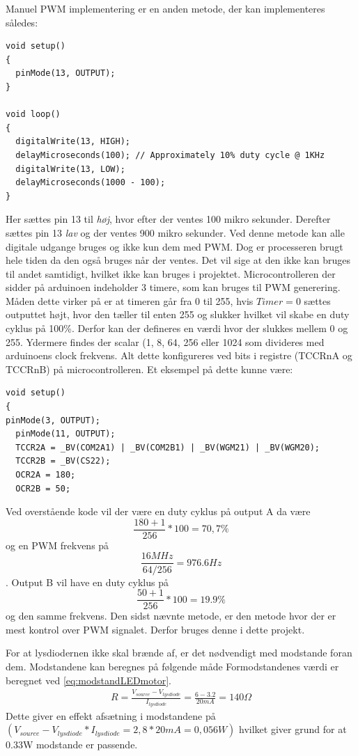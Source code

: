 Manuel PWM implementering er en anden metode, der kan implementeres således:

\begin{lstlisting}
void setup()
{
  pinMode(13, OUTPUT);
}

void loop()
{
  digitalWrite(13, HIGH);
  delayMicroseconds(100); // Approximately 10% duty cycle @ 1KHz
  digitalWrite(13, LOW);
  delayMicroseconds(1000 - 100);
}
\end{lstlisting}

Her sættes pin 13 til \textit{høj}, hvor efter der ventes 100 mikro sekunder. Derefter sættes pin 13 \textit{lav} og der ventes 900 mikro sekunder. Ved denne metode kan alle digitale udgange bruges og ikke kun dem med PWM. Dog er processeren brugt hele tiden da den også bruges når der ventes. Det vil sige at den ikke kan bruges til andet samtidigt, hvilket ikke kan bruges i projektet.
Microcontrolleren der sidder på arduinoen indeholder 3 timere, som kan bruges til PWM generering.  Måden dette virker på er at timeren går fra 0 til 255, hvis $Timer=0$ sættes outputtet højt, hvor den tæller til enten 255 og slukker hvilket vil skabe en duty cyklus på 100\%. Derfor kan der defineres en værdi hvor der slukkes mellem 0 og 255. Ydermere findes der scalar (1, 8, 64, 256 eller 1024 som divideres med arduinoens clock frekvens. Alt dette konfigureres ved bits i registre (TCCRnA og TCCRnB) på microcontrolleren. Et eksempel på dette kunne være: 

\begin{lstlisting}
void setup()
{
pinMode(3, OUTPUT);
  pinMode(11, OUTPUT);
  TCCR2A = _BV(COM2A1) | _BV(COM2B1) | _BV(WGM21) | _BV(WGM20);
  TCCR2B = _BV(CS22);
  OCR2A = 180;
  OCR2B = 50;
\end{lstlisting}

Ved overstående kode vil der være en duty cyklus på output A da være $$\frac{180+1}{256}*100=70,7\%$$ og en PWM frekvens på     
  $$\frac{16MHz}{64/256}=976.6Hz$$. Output B vil have en duty cyklus på $$\frac{50+1}{256}*100=19.9 \%$$ og den samme frekvens. Den sidst nævnte metode, er den metode hvor der er mest kontrol over PWM signalet. Derfor bruges denne i dette projekt.
  
For at lysdiodernen ikke skal brænde af, er det nødvendigt med modstande foran dem. Modstandene kan beregnes på følgende måde
Formodstandenes værdi er beregnet ved \ref{eq:modstandLEDmotor}. 
\begin{align}
R=\frac{V_{source}-V_{lysdiode}}{I_{lysdiode}}=\frac{6-3.2}{20mA}=140\Omega
\label{eq:modstandLEDmotor}
\end{align} 
Dette giver en effekt afsætning i modstandene på $(V_{source}-V_{lysdiode}*I_{lysdiode}=2,8*20mA=0,056W)$ hvilket giver grund for at 0.33W modstande er passende.


